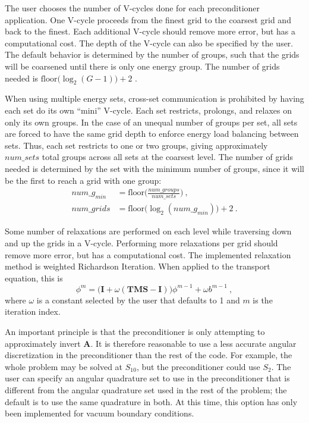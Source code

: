 \documentclass{article}                                                                           %
\newcommand{\ve}[1]{\ensuremath{\mathbf{#1}}}
\begin{document}
The user chooses the number of V-cycles done for each preconditioner application. One V-cycle proceeds from the finest grid to the coarsest grid and back to the finest. Each additional V-cycle should remove more error, but has a computational cost. The depth of the V-cycle can also be specified by the user. The default behavior is determined by the number of groups, such that the grids will be coarsened until there is only one energy group. The number of grids needed is $\text{floor}\bigl( \log_{2}(G-1) \bigr) + 2$ \cite{BinaryTree2012}.%

When using multiple energy sets, cross-set communication is prohibited by having each set do its own ``mini'' V-cycle. Each set restricts, prolongs, and relaxes on only its own groups. In the case of an unequal number of groups per set, all sets are forced to have the same grid depth to enforce energy load balancing between sets. Thus, each set restricts to one or two groups, giving approximately $num\_sets$ total groups across all sets at the coarsest level. The number of grids needed is determined by the set with the minimum number of groups, since it will be the first to reach a grid with one group:%
\begin{align}
  num\_g_{min} &= \text{floor}\bigl(\frac{num\_groups}{num\_sets}\bigr) \:, \\
  num\_grids &= \text{floor}\bigl( \log_{2}(num\_g_{min}) \bigr) + 2 \:.
  \label{eq:multisetGrids}
\end{align}

Some number of relaxations are performed on each level while traversing down and up the grids in a V-cycle. Performing more relaxations per grid should remove more error, but has a computational cost. The implemented relaxation method is weighted Richardson Iteration. When applied to the transport equation, this is
%
\begin{equation}
  \phi^{m} = \bigr(\ve{I} + \omega(\ve{TMS} - \ve{I})\bigl)\phi^{m-1} + \omega b^{m-1} \:,
  \label{eq:relax}
 \end{equation}
%
where $\omega$ is a constant selected by the user that defaults to 1 and $m$ is the iteration index. 

An important principle is that the preconditioner is only attempting to approximately invert $\ve{A}$. It is therefore reasonable to use a less accurate angular discretization in the preconditioner than the rest of the code. For example, the whole problem may be solved at $S_{10}$, but the preconditioner could use $S_{2}$. The user can specify an angular quadrature set to use in the preconditioner that is different from the angular quadrature set used in the rest of the problem; the default is to use the same quadrature in both. At this time, this option has only been implemented for vacuum boundary conditions. 
\end{document}
